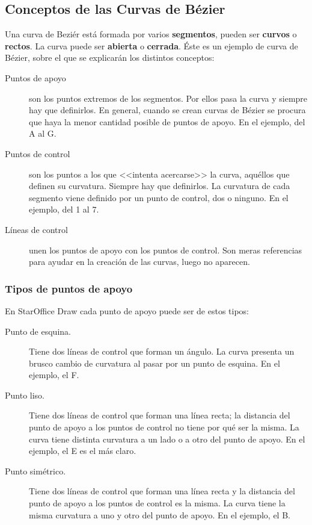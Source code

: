 \subsection{Conceptos de las Curvas de Bézier}

Una curva de Beziér está formada por varios \textbf{segmentos}, pueden
ser \textbf{curvos} o \textbf{rectos}. La curva puede ser
\textbf{abierta} o \textbf{cerrada}. Éste es un ejemplo de curva de
Bézier, sobre el que se explicarán los distintos conceptos:

\begin{description}
\item[Puntos de apoyo] son los puntos extremos de los segmentos. 
Por ellos pasa la curva y siempre hay que definirlos. En general, 
cuando se crean curvas de Bézier se procura que haya la menor 
cantidad posible de puntos de apoyo. En el ejemplo, del A al G.

\item[Puntos de control] son los puntos a los que <<intenta acercarse>> 
la curva, aquéllos que definen su curvatura. Siempre hay que definirlos. 
La curvatura de cada segmento viene definido por un punto de control, 
dos o ninguno. En el ejemplo, del 1 al 7.

\item[Líneas de control] unen los puntos de apoyo con los puntos de 
control. Son meras referencias para ayudar en la creación de las 
curvas, luego no aparecen.
\end{description}

\subsubsection{Tipos de puntos de apoyo}
En StarOffice Draw cada punto de apoyo puede ser de estos tipos:

\begin{description}
\item[Punto de esquina.] Tiene dos líneas de control que forman un 
ángulo. La curva presenta un brusco cambio de curvatura al pasar 
por un punto de esquina. En el ejemplo, el F.

\item[Punto liso.] Tiene dos líneas de control que forman una 
línea recta; la distancia del punto de apoyo a los puntos de 
control no tiene por qué ser la misma. La curva tiene distinta 
curvatura a un lado o a otro del punto de apoyo. En el ejemplo, 
el E es el más claro.

\item[Punto simétrico.] Tiene dos líneas de control que forman 
una línea recta y la distancia del punto de apoyo a los puntos 
de control es la misma. La curva tiene la misma curvatura a uno 
y otro del punto de apoyo. En el ejemplo, el B.
\end{description}

